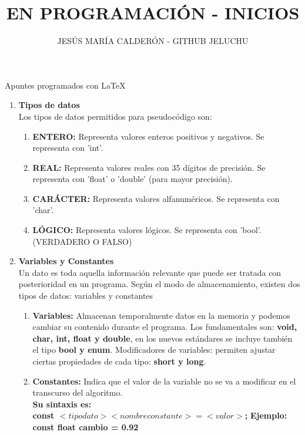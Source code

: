 \documentclass[10pt,a4paper]{article}
\title{EN PROGRAMACIÓN - INICIOS}
\author{JESÚS MARÍA CALDERÓN - GITHUB JELUCHU}
\begin{document}
\maketitle
\center Apuntes programados con \LaTeX{}
\bigskip
\begin{enumerate}
\item \textbf{Tipos de datos} \\
Los tipos de datos permitidos para pseudocódigo son:
\begin{enumerate}
\item \textbf{ENTERO:} Representa valores enteros positivos y negativos. Se representa con 'int'.
\item \textbf{REAL:} Representa valores reales con 35 dígitos de precisión. Se representa con 'float' o 'double' (para mayor precisión).
\item \textbf{CARÁCTER:} Representa valores alfanuméricos. Se representa con 'char'.
\item \textbf{LÓGICO:} Representa valores lógicos. Se representa con 'bool'. \\ (VERDADERO O FALSO)
\end{enumerate}
\medskip
\item \textbf{Variables y Constantes} \\
Un dato es toda aquella información relevante que puede ser tratada con posterioridad en un programa. Según el modo de almacenamiento, existen dos tipos de datos: variables y constantes
\begin{enumerate}
\item \textbf{Variables:} Almacenan temporalmente datos en la memoria y podemos cambiar su contenido durante el programa. Los fundamentales son: \textbf{void, char, int, float y double}, en los nuevos estándares se incluye también el tipo \textbf{bool y enum}. Modificadores de variables: permiten ajustar ciertas propiedades de cada tipo: \textbf{short y long}.
\smallskip
\item \textbf{Constantes:} Indica que el valor de la variable no se va a modificar en el transcurso del algoritmo.
\smallskip \\
\center \textbf{Su sintaxis es: \\
const  $<tipo dato>   <nombre constante>   =   <valor>$;} 
\medskip \center \textbf{Ejemplo:   const float cambio = 0.92}  
\end{enumerate}
\end{enumerate}
\end{document}
